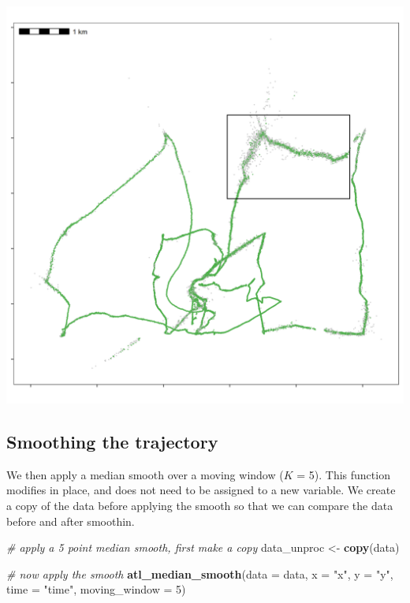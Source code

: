 \documentclass[
]{scrartcl}
\newenvironment{Shaded}{}{}
\newcommand{\CommentTok}[1]{\textcolor[rgb]{0.38,0.63,0.69}{\textit{#1}}}
\newcommand{\DataTypeTok}[1]{\textcolor[rgb]{0.56,0.13,0.00}{#1}}
\newcommand{\DecValTok}[1]{\textcolor[rgb]{0.25,0.63,0.44}{#1}}
\newcommand{\KeywordTok}[1]{\textcolor[rgb]{0.00,0.44,0.13}{\textbf{#1}}}
\newcommand{\NormalTok}[1]{#1}
\newcommand{\StringTok}[1]{\textcolor[rgb]{0.25,0.44,0.63}{#1}}
\begin{document}
\includegraphics{figures/fig_speed_outlier.png}

\hypertarget{smoothing-the-trajectory}{%
\subsection{Smoothing the trajectory}\label{smoothing-the-trajectory}}

We then apply a median smooth over a moving window (\(K\) = 5).
This function modifies in place, and does not need to be assigned to a new variable.
We create a copy of the data before applying the smooth so that we can compare the data before and after smoothin.

\begin{Shaded}
\begin{Highlighting}[]
\CommentTok{\# apply a 5 point median smooth, first make a copy}
\NormalTok{data\_unproc <{-}}\StringTok{ }\KeywordTok{copy}\NormalTok{(data)}

\CommentTok{\# now apply the smooth}
\KeywordTok{atl\_median\_smooth}\NormalTok{(}\DataTypeTok{data =}\NormalTok{ data,}
                  \DataTypeTok{x =} \StringTok{"x"}\NormalTok{, }\DataTypeTok{y =} \StringTok{"y"}\NormalTok{, }\DataTypeTok{time =} \StringTok{"time"}\NormalTok{,}
                  \DataTypeTok{moving\_window =} \DecValTok{5}\NormalTok{)}
\end{Highlighting}
\end{Shaded}
\end{document}
